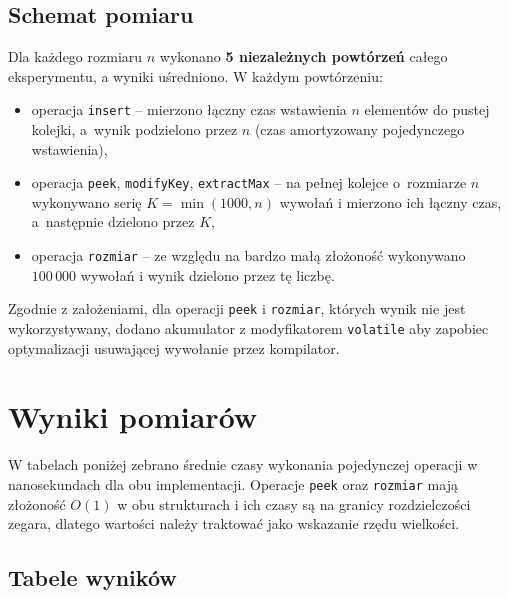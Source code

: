 \subsection{Schemat pomiaru}

Dla każdego rozmiaru $n$ wykonano \textbf{5 niezależnych powtórzeń}
całego eksperymentu, a wyniki uśredniono. W każdym powtórzeniu:
\begin{itemize}
    \item operacja \texttt{insert} -- mierzono łączny czas wstawienia $n$ elementów do pustej kolejki, a~wynik podzielono przez $n$ (czas amortyzowany pojedynczego wstawienia),
    \item operacja \texttt{peek}, \texttt{modifyKey}, \texttt{extractMax} -- na pełnej kolejce o~rozmiarze $n$ wykonywano serię $K = \min(1000, n)$ wywołań i mierzono ich łączny czas, a~następnie dzielono przez $K$,
    \item operacja \texttt{rozmiar} -- ze względu na bardzo małą złożoność wykonywano $100\,000$ wywołań i wynik dzielono przez tę liczbę.
\end{itemize}

Zgodnie z założeniami, dla operacji \texttt{peek} i \texttt{rozmiar}, których
wynik nie jest wykorzystywany, dodano akumulator z modyfikatorem \texttt{volatile}
aby zapobiec optymalizacji usuwającej wywołanie przez kompilator.

\section{Wyniki pomiarów}

W tabelach poniżej zebrano średnie czasy wykonania pojedynczej operacji
w nanosekundach dla obu implementacji. Operacje \texttt{peek} oraz
\texttt{rozmiar} mają złożoność $O(1)$ w obu strukturach i ich czasy są na
granicy rozdzielczości zegara, dlatego wartości należy traktować jako wskazanie
rzędu wielkości.

\subsection{Tabele wyników}

\begin{table}[H]
\centering
\caption{Kopiec binarny -- średnie czasy operacji [ns].}
\end{table}

